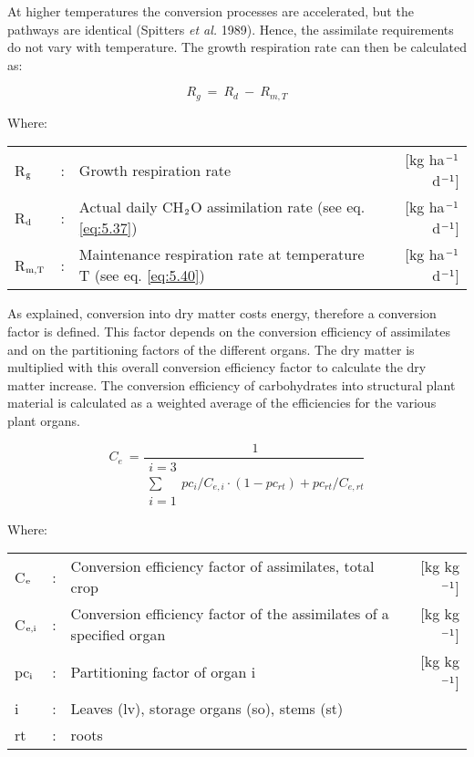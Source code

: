 At higher temperatures the conversion processes are accelerated, but the pathways are
identical (Spitters {\it et al.} 1989). Hence, the assimilate requirements do not vary with
temperature. The growth respiration rate can then be calculated as:

\begin{equation}
\label{eq:5.41}
R _{g} ~=~ R _{d} ~-~ R _{m,T} 
\end{equation}

Where:\\[5pt]
\begin{tabularx}{\textwidth}{llXr}
	R$_{{\rm g}}$ &:& Growth respiration rate   &     [kg ha$^{{\rm -1}}$ d$^{{\rm -1}}$]\\
	R$_{{\rm d}}$ &:& Actual daily CH$_{{\rm 2}}$O assimilation rate (see eq. \ref{eq:5.37})   &   
	[kg ha$^{{\rm -1}}$ d$^{{\rm -1}}$]\\
	R$_{{\rm m,T}}$ &:& Maintenance respiration rate at 
	temperature T (see eq. \ref{eq:5.40})   &     [kg ha$^{{\rm -1}}$ d$^{{\rm -1}}$]\\
\end{tabularx}

As explained, conversion into dry matter costs energy, therefore a conversion factor is
defined. This factor depends on the conversion efficiency of assimilates and on the
partitioning factors of the different organs. The dry matter is multiplied with this overall
conversion efficiency factor to calculate the dry matter increase. The conversion 
efficiency of carbohydrates into structural plant material is calculated as a weighted average
of the efficiencies for the various plant organs.

\begin{equation}
\label{eq:5.42}
C _{e} ~={\frac{~1}{
		\begin{array}{c}
		{i=3}  \\
		\sum  \\
		{i=1}
		\end{array} {pc_{i}}/{C_{e,i}} \cdot (1-pc_{rt} ) + {pc_{rt}}/{C_{e,rt}} 
}}
\end{equation}

Where:\\[5pt]
\begin{tabularx}{\textwidth}{llXr}
	C$_{{\rm e}}$ &:& Conversion efficiency factor of assimilates, total crop  &   
	[kg kg$^{{\rm -1}}$]\\
	C$_{{\rm e,i}}$ &:& Conversion efficiency factor of the assimilates 
	of a specified organ  &      [kg kg$^{{\rm -1}}$]\\
	pc$_{{\rm i}}$ &:& Partitioning factor of organ i   &
	[kg kg$^{{\rm -1}}$]\\
	i &:& Leaves (lv), storage organs (so), stems (st)\\
	rt &:& roots\\
\end{tabularx}

